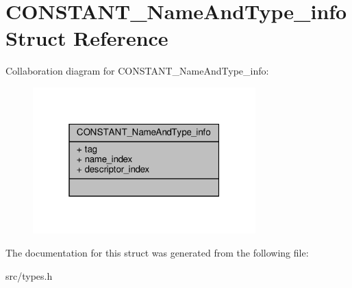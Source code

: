 \hypertarget{structCONSTANT__NameAndType__info}{}\section{C\+O\+N\+S\+T\+A\+N\+T\+\_\+\+Name\+And\+Type\+\_\+info Struct Reference}
\label{structCONSTANT__NameAndType__info}


Collaboration diagram for C\+O\+N\+S\+T\+A\+N\+T\+\_\+\+Name\+And\+Type\+\_\+info\+:\nopagebreak
\begin{figure}[H]
\begin{center}
\leavevmode
\includegraphics[width=244pt]{structCONSTANT__NameAndType__info__coll__graph}
\end{center}
\end{figure}


The documentation for this struct was generated from the following file\+:\begin{DoxyCompactItemize}
\item 
src/types.\+h\end{DoxyCompactItemize}
